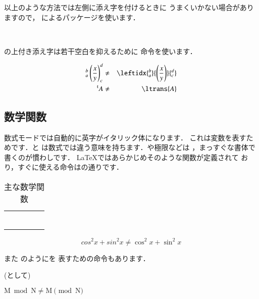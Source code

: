 以上のような方法では左側に添え字を付けるときに
うまくいかない場合がありますので，
によるパッケージを使います．
\begin{Syntax}
\\
\end{Syntax}

の上付き添え字は若干空白を抑えるために 
命令を使います．
\begin{InOut}
\begin{eqnarray*}
{}_a^b\left(\frac{x}{y}\right)_c^d 
  &\neq& \leftidx{_a^b}{\left(
    \frac{x}{y} \right)}{_c^d}\\
{}^\mathrm{t} A &\neq& \ltrans{A}
\end{eqnarray*}
\end{InOut}


\subsection{数学関数}
数式モードでは自動的に英字がイタリック体になります．
これは変数を表すためです．と
は数式では違う意味を持ちます．や極限などは
，まっすぐな書体で書くのが慣わしです．
{\LaTeX}ではあらかじめそのような関数が定義されて
おり，すぐに使える命令はの通りです．
\begin{table}[htbp]
\begin{scenter}
 \caption{主な数学関数}
 \begin{tabular}{LCCCC}
  &   &  &  &   \\
  &  &  &  &   \\
  &   &  &     &  \\
     &   &  &     &   \\
     &   &  &     &   \\
    &   &  &      &  \\
 \end{tabular}
\end{scenter}
\end{table}
%
\begin{InOut}
\[cos^2x+sin^2x \neq \cos^2x+\sin^2x\]
\end{InOut}
また  のように{}を
表すための命令もあります．%
\begin{Syntax}
 (として)\\
\end{Syntax}
\begin{InOut}
\( \mathrm M\bmod{\mathrm N} \neq 
   \mathrm M\pmod{\mathrm N} \)
\end{InOut}

